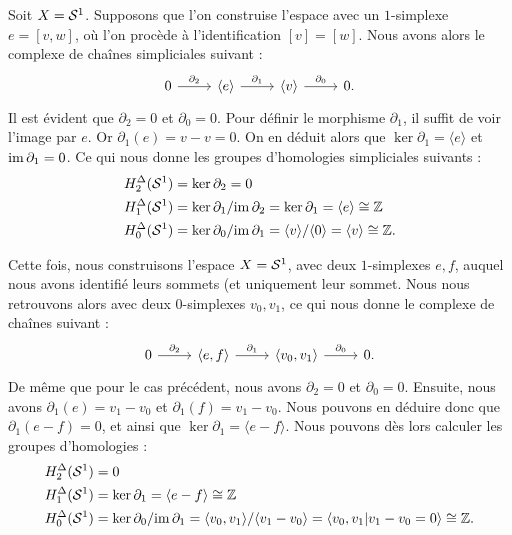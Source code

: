 \begin{exemple}
Soit $X=\mathcal{S}^{1}$. Supposons que l'on construise l'espace avec un $1$-simplexe $e=[v,w]$, où l'on procède à l'identification $[v]=[w]$. Nous avons alors le complexe de chaînes simpliciales suivant :
\[\begin{tikzcd}
0\arrow[r,"\partial_2"]& \langle e\rangle\arrow[r, "\partial_1"]&\langle v\rangle\arrow[r,"\partial_0"]&0.
\end{tikzcd}\]
Il est évident que $\partial_2=0$ et $\partial_0=0$. Pour définir le morphisme $\partial_1$, il suffit de voir l'image par $e$. Or $\partial_1(e)=v-v=0$. On en déduit alors que $\ker\partial_1=\langle e\rangle$ et $\mathrm{im}\,\partial_1=0$. Ce qui nous donne les groupes d'homologies simpliciales suivants : 
\[\begin{split}
    H^\Delta_2(\mathcal{S}^{1}) &= \ker\partial_2 = 0 \\
    H^\Delta_1(\mathcal{S}^{1}) &= \ker\partial_1/\mathrm{im}\,\partial_2 = \ker\partial_1 = \langle e \rangle\cong\mathbb{Z} \\
    H^\Delta_0(\mathcal{S}^{1}) &= \ker\partial_0/\mathrm{im}\,\partial_1 = \langle v \rangle/\langle 0 \rangle = \langle v \rangle\cong\mathbb{Z}.
\end{split}\]

Cette fois, nous construisons l'espace $X=\mathcal{S}^{1}$, avec deux $1$-simplexes $e,f$, auquel nous avons identifié leurs sommets (et uniquement leur sommet. Nous nous retrouvons alors avec deux 0-simplexes $v_0,v_1$, ce qui nous donne le complexe de chaînes suivant : 
\[\begin{tikzcd}
0\arrow[r,"\partial_2"]& \langle e,f\rangle\arrow[r, "\partial_1"]&\langle v_0,v_1\rangle\arrow[r,"\partial_0"]&0.
\end{tikzcd}\]
De même que pour le cas précédent, nous avons $\partial_2=0$ et $\partial_0=0$. Ensuite, nous avons $\partial_1(e)=v_1-v_0$ et $\partial_1(f)=v_1-v_0$. Nous pouvons en déduire donc que $\partial_1(e-f)=0$, et ainsi que $\ker\partial_1=\langle e-f\rangle$. Nous pouvons dès lors calculer les groupes d'homologies : \[\begin{split}
H^\Delta_2(\mathcal{S}^{1}) &= 0 \\
H^\Delta_1(\mathcal{S}^{1}) &= \ker\partial_1 = \langle e-f \rangle \cong\mathbb{Z}\\
H^\Delta_0(\mathcal{S}^{1}) &= \ker\partial_0/\mathrm{im}\,\partial_1 = \langle v_0,v_1 \rangle/\langle v_1-v_0 \rangle = \langle v_0,v_1|v_1-v_0=0 \rangle\cong\mathbb{Z}.
\end{split}\]
\end{exemple}

